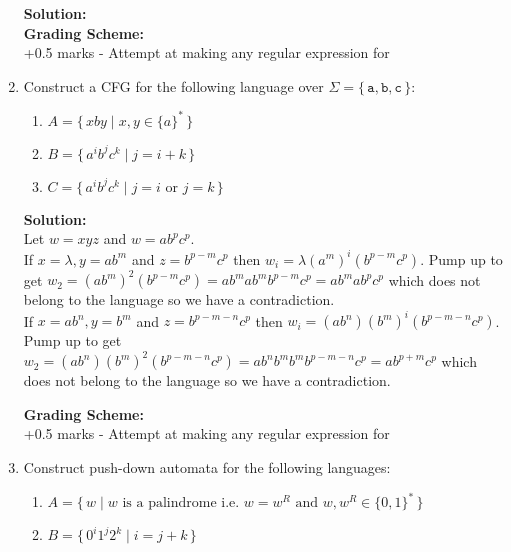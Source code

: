 \documentclass[11pt, article, oneside]{memoir}
\newcommand{\set}[1]{\{\, #1\, \}}
\begin{document}
\begin{enumerate}
        \textbf{Solution:}
        \\

        \textbf{Grading Scheme:}
        \\+0.5 marks - Attempt at making any regular expression for
        
    \item
        Construct a CFG for the following language over \(\Sigma = \set{\texttt{a}, \texttt{b}, \texttt{c}}\):
        \begin{enumerate}
            \item
                \(A = \set{xby \mid x, y \in \{a\}^*}\) 
            \item
                \(B = \set{ {a^i}{b^j}{c^k} \mid j = i + k}\)
            \item
                \(C = \set{ {a^i}{b^j}{c^k} \mid j = i \text{ or } j = k}\)
        \end{enumerate}
                
        \textbf{Solution:}
        \\Let \(w = xyz\) and \(w = ab^pc^p\).
        \\If \(x = \lambda, y = ab^m\) and \(z = b^{p - m}c^p\) then \(w_i = \lambda(a^m)^i(b^{p - m}c^p)\). Pump up to get \(w_2 = (ab^m)^2(b^{p - m}c^p) = ab^mab^mb^{p - m}c^p = ab^mab^pc^p\) which does not belong to the language so we have a contradiction.
        \\If \(x = ab^n, y = b^m\) and \(z = b^{p - m - n}c^p\) then \(w_i = (ab^n)(b^m)^i(b^{p - m - n}c^p)\). Pump up to get \(w_2 = (ab^n)(b^m)^2(b^{p - m - n}c^p) = ab^nb^mb^mb^{p - m - n}c^p = ab^{p + m}c^p\) which does not belong to the language so we have a contradiction.

        \textbf{Grading Scheme:}
        \\+0.5 marks - Attempt at making any regular expression for
        
    \item
        Construct push-down automata for the following languages:
        \begin{enumerate}
            \item
                \(A = \set{w \mid w \text{ is a palindrome i.e. } w = w^R \text{ and } w, w^R \in \{0, 1\}^*}\) 
            \item
                \(B = \set{ {0^i}{1^j}{2^k} \mid i = j + k}\)
        \end{enumerate}


\end{enumerate}
\end{document}
